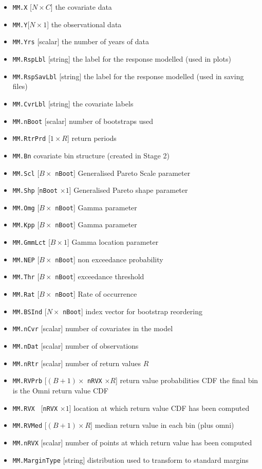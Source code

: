 \begin{itemize}
	\item \verb|MM.X| [$N \times C$]  the covariate data
	\item \verb|MM.Y|[$N \times 1$] the observational data
	\item \verb|MM.Yrs| [scalar] the number of years of data
	\item \verb|MM.RspLbl| [string] the label for the response modelled (used in plots)
	\item \verb|MM.RspSavLbl|  [string] the label for the response modelled (used in saving files)
	\item \verb|MM.CvrLbl|  [string] the covariate labels
	\item \verb|MM.nBoot| [scalar]   number of bootstraps used
	\item \verb|MM.RtrPrd| [$1 \times R$] return periods
	\item \verb|MM.Bn| covariate bin structure (created in Stage 2)
	\item \verb|MM.Scl|  [$B \times $ \verb|nBoot|] Generalised Pareto Scale parameter 
	\item \verb|MM.Shp|  [\verb|nBoot| $ \times 1$] Generalised Pareto shape parameter 
	\item \verb|MM.Omg|  [$B \times $ \verb|nBoot|] Gamma parameter 
	\item \verb|MM.Kpp|  [$B \times $ \verb|nBoot|] Gamma parameter 
	\item \verb|MM.GmmLct| [$B \times 1$] Gamma location parameter
	\item \verb|MM.NEP| [$B \times $ \verb|nBoot|] non exceedance probability
	\item \verb|MM.Thr| [$B \times $ \verb|nBoot|] exceedance threshold 
	\item \verb|MM.Rat|  [$B \times $ \verb|nBoot|] Rate of occurrence 
	\item \verb|MM.BSInd|  [$N \times $ \verb|nBoot|] index vector for bootstrap reordering
	\item \verb|MM.nCvr| [scalar] number of covariates in the model
	\item \verb|MM.nDat| [scalar]  number of observations
	\item \verb|MM.nRtr| [scalar] number of return values $R$
	\item \verb|MM.RVPrb| [$(B+1) \times$ \verb|nRVX| $\times R$] return value probabilities CDF the final bin is the Omni return value CDF
	\item \verb|MM.RVX |  [\verb|nRVX| $ \times 1$] location at which return value CDF has been computed
	\item \verb|MM.RVMed|  [$(B+1) \times R$] median return value in each bin (plus omni)
	\item \verb|MM.nRVX|  [scalar] number of points at which return value has been computed
	\item \verb|MM.MarginType| [string] distribution used to transform to standard margins
\end{itemize}


